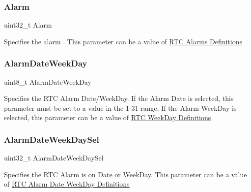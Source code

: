 \subsubsection{\texorpdfstring{Alarm}{Alarm}}
{\footnotesize\ttfamily uint32\+\_\+t Alarm}

Specifies the alarm . This parameter can be a value of \hyperlink{group___r_t_c___alarms___definitions}{R\+TC Alarms Definitions} \mbox{\label{struct_r_t_c___alarm_type_def_a48a4eec6d33bb4b06f408e8e28c0c0ed}} 
\subsubsection{\texorpdfstring{Alarm\+Date\+Week\+Day}{AlarmDateWeekDay}}
{\footnotesize\ttfamily uint8\+\_\+t Alarm\+Date\+Week\+Day}

Specifies the R\+TC Alarm Date/\+Week\+Day. If the Alarm Date is selected, this parameter must be set to a value in the 1-\/31 range. If the Alarm Week\+Day is selected, this parameter can be a value of \hyperlink{group___r_t_c___week_day___definitions}{R\+TC Week\+Day Definitions} \mbox{\label{struct_r_t_c___alarm_type_def_a1c87355c52b57692c8de8da7c9954987}} 
\subsubsection{\texorpdfstring{Alarm\+Date\+Week\+Day\+Sel}{AlarmDateWeekDaySel}}
{\footnotesize\ttfamily uint32\+\_\+t Alarm\+Date\+Week\+Day\+Sel}

Specifies the R\+TC Alarm is on Date or Week\+Day. This parameter can be a value of \hyperlink{group___r_t_c___alarm_date_week_day___definitions}{R\+TC Alarm Date Week\+Day Definitions} \mbox{\label{struct_r_t_c___alarm_type_def_abf8acd34aba8f7a8e7c7d156a3af33c4}} 
